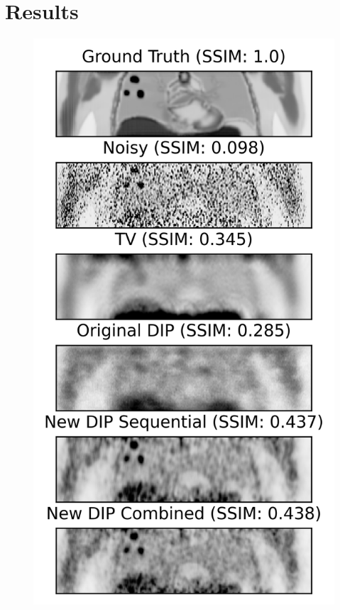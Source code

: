 \section{Results} \label{sec:results}
    \begin{figure}
        
        \centering
    
        \includegraphics[width=1.0\linewidth]{figures/visual_analysis.png}    
        

\end{figure}

